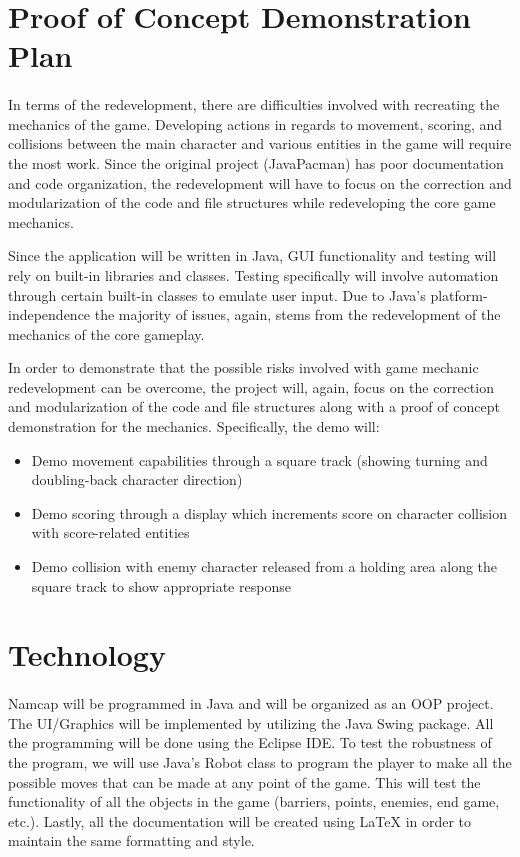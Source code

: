 \documentclass{article}
\begin{document}
\section{Proof of Concept Demonstration Plan}

\paragraph{}
In terms of the redevelopment, there are difficulties involved with recreating the mechanics of the game. Developing actions in regards to movement, scoring, and collisions between the main character and various entities in the game will require the most work. Since the original project (JavaPacman) has poor documentation and code organization, the redevelopment will have to focus on the correction and modularization of the code and file structures while redeveloping the core game mechanics.\par Since the application will be written in Java, GUI functionality and testing will rely on built-in libraries and classes. Testing specifically will involve automation through certain built-in classes to emulate user input. Due to Java’s platform-independence the majority of issues, again, stems from the redevelopment of the mechanics of the core gameplay.\par In order to demonstrate that the possible risks involved with game mechanic redevelopment can be overcome, the project will, again, focus on the correction and modularization of the code and file structures along with a proof of concept demonstration for the mechanics. Specifically, the demo will:
\begin{itemize}
\item Demo movement capabilities through a square track (showing turning and doubling-back character direction)
\item Demo scoring through a display which increments score on character collision with score-related entities
\item Demo collision with enemy character released from a holding area along the square track to show appropriate response
\end{itemize}   

\section{Technology}

\paragraph{}
Namcap will be programmed in Java and will be organized as an OOP project. The UI/Graphics will be implemented by utilizing the Java Swing package. All the programming will be done using the Eclipse IDE. To test the robustness of the program, we will use Java's Robot class to program the player to make all the possible moves that can be made at any point of the game. This will test the functionality of all the objects in the game (barriers, points, enemies, end game, etc.). Lastly, all the documentation will be created using LaTeX in order to maintain the same formatting and style.
\end{document}
